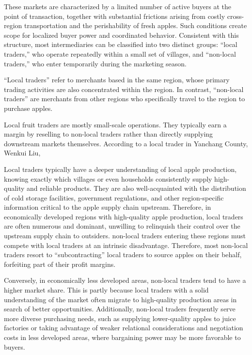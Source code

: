 These markets are characterized by a limited number of active buyers at the point of transaction, together with substantial frictions arising from costly cross-region transportation and the perishability of fresh apples. Such conditions create scope for localized buyer power and coordinated behavior. Consistent with this structure, most intermediaries can be classified into two distinct groups: ``local traders,'' who operate repeatedly within a small set of villages, and ``non-local traders,'' who enter temporarily during the marketing season.

``Local traders'' refer to merchants based in the same region, whose primary trading activities are also concentrated within the region. In contrast, ``non-local traders'' are merchants from other regions who specifically travel to the region to purchase apples.  

Local fruit traders are mostly small-scale operations. They typically earn a margin by reselling to non-local traders rather than directly supplying downstream markets themselves. According to a local trader in Yanchang County, Wenkui Liu, 

Local traders typically have a deeper understanding of local apple production, knowing exactly which villages or even households consistently supply high-quality and reliable products. They are also well-acquainted with the distribution of cold storage facilities, government regulations, and other region-specific information critical to the apple supply chain upstream. Therefore, in economically developed regions with high-quality apple production, local traders are often numerous and dominant, unwilling to relinquish their control over the upstream supply chain to outsiders. non-local traders entering these regions must compete with local traders at an intrinsic disadvantage. Therefore, most non-local traders resort to ``subcontracting'' local traders to source apples on their behalf, forfeiting part of their profit margins.  

Conversely, in economically less developed areas, non-local traders tend to have a higher market share. This is partly because local traders with a solid understanding of the market often migrate to high-quality production areas in search of better opportunities. Additionally, non-local traders frequently serve more diverse purchasing needs, such as supplying lower-quality apples to juice factories or taking advantage of weaker relational considerations and negotiation costs in less developed areas, where bargaining power may be more favorable to buyers.  


